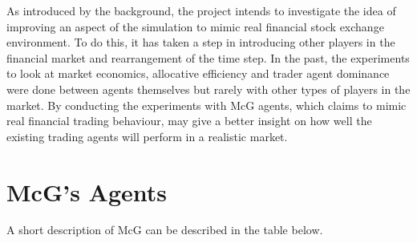 % 

As introduced by the background, the project intends to investigate the idea of improving an aspect of the simulation to mimic real financial stock exchange environment. To do this, it has taken a step in introducing other players in the financial market and rearrangement of the time step. In the past, the experiments to look at market economics, allocative efficiency and trader agent dominance were done between agents themselves but rarely with other types of players in the market. By conducting the experiments with McG agents, which claims to mimic real financial trading behaviour, may give a better insight on how well the existing trading agents will perform in a realistic market. 

\section{McG's Agents}
A short description of McG can be described in the table below.

